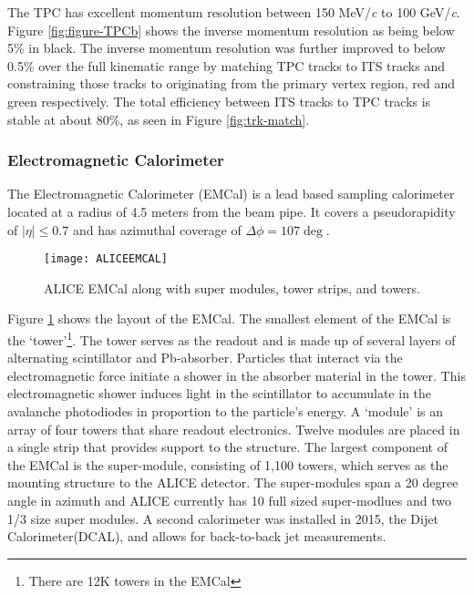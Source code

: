 The TPC has excellent momentum resolution between 150 MeV/\textit{c} to 100 GeV/\textit{c}\cite{LIPPMANN2012434}.  Figure \ref{fig:figure-TPCb} shows the inverse momentum resolution as being below 5\% in black.  The inverse momentum resolution was further improved to below 0.5\% over the full kinematic range by matching TPC tracks to ITS tracks and constraining those tracks to originating from the primary vertex region, red and green respectively.  The total efficiency between ITS tracks to TPC tracks is stable at about 80\%, as seen in Figure \ref{fig:trk-match}.




\subsubsection{Electromagnetic Calorimeter}
The Electromagnetic Calorimeter (EMCal)\cite{1742-6596-293-1-012043} is a lead based sampling calorimeter located at a radius of 4.5 meters from the beam pipe.  It covers a pseudorapidity of $ \left | \eta \right | \leq 0.7$ and has azimuthal coverage of $ \Delta \phi = 107 \deg$.

\begin{figure}[h]
\texttt{[image: ALICEEMCAL]}
\centering
\caption{ALICE EMCal along with super modules, tower strips, and towers\cite{1742-6596-110-3-032006}.}
\label{fig:EMCal}
\end{figure}


Figure \ref{fig:EMCal} shows the layout of the EMCal.  The smallest element of the EMCal is the `tower'\footnote{There are 12K towers in the EMCal}.  The tower serves as the readout and is made up of several layers of alternating scintillator and Pb-absorber.  Particles that interact via the electromagnetic force initiate a shower in the absorber material in the tower.  This electromagnetic shower induces light in the scintillator  to accumulate in the avalanche photodiodes in proportion to the particle's energy.  A `module' is an array of four towers that share readout electronics.  Twelve modules are placed in a single strip that provides support to the structure.  The largest component of the EMCal is the super-module, consisting of 1,100 towers,  which serves as the mounting structure to the ALICE detector.  The super-modules span a 20 degree angle in azimuth and ALICE currently has 10 full sized super-modlues and two 1/3 size super modules.  A second calorimeter was installed in 2015, the Dijet Calorimeter(DCAL), and allows for back-to-back jet measurements.


